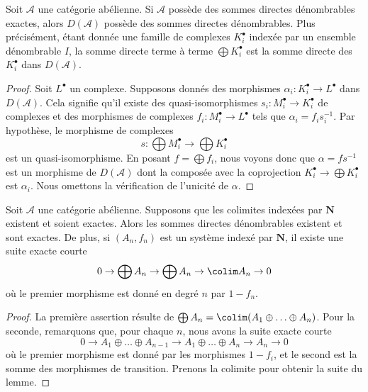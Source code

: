\begin{lemma}
\label{lemma-direct-sums}
Soit $\mathcal{A}$ une catégorie abélienne.
Si $\mathcal{A}$ possède des sommes directes dénombrables exactes, alors
$D(\mathcal{A})$ possède des sommes directes dénombrables. Plus précisément,
étant donnée une famille de complexes $K_i^\bullet$ indexée par un ensemble
dénombrable $I$, la somme directe terme à terme $\bigoplus K_i^\bullet$ est la
somme directe des $K_i^\bullet$ dans $D(\mathcal{A})$.
\end{lemma}

\begin{proof}
Soit $L^\bullet$ un complexe. Supposons donnés des morphismes
$\alpha_i : K_i^\bullet \to L^\bullet$ dans $D(\mathcal{A})$.
Cela signifie qu'il existe des quasi-isomorphismes
$s_i : M_i^\bullet \to K_i^\bullet$ de complexes et des morphismes de
complexes $f_i : M_i^\bullet \to L^\bullet$ tels que
$\alpha_i = f_is_i^{-1}$. Par hypothèse, le morphisme de complexes
$$
s : \bigoplus M_i^\bullet \longrightarrow \bigoplus K_i^\bullet
$$
est un quasi-isomorphisme. En posant $f = \bigoplus f_i$, nous voyons donc que
$\alpha = fs^{-1}$ est un morphisme de $D(\mathcal{A})$ dont la composée avec
la coprojection $K_i^\bullet \to \bigoplus K_i^\bullet$ est $\alpha_i$.
Nous omettons la vérification de l'unicité de $\alpha$.
\end{proof}

\begin{lemma}
\label{lemma-compute-colimit}
Soit $\mathcal{A}$ une catégorie abélienne. Supposons que les colimites
indexées par $\mathbf{N}$ existent et soient exactes. Alors les sommes directes
dénombrables existent et sont exactes. De plus, si $(A_n, f_n)$ est un système
indexé par $\mathbf{N}$, il existe une suite exacte courte
$$
0 \to \bigoplus A_n \to \bigoplus A_n \to \colim A_n \to 0
$$
où le premier morphisme est donné en degré $n$ par $1 - f_n$.
\end{lemma}

\begin{proof}
La première assertion résulte de
$\bigoplus A_n = \colim (A_1 \oplus \ldots \oplus A_n)$.
Pour la seconde, remarquons que, pour chaque $n$, nous avons la suite exacte
courte
$$
0 \to
A_1 \oplus \ldots \oplus A_{n - 1} \to
A_1 \oplus \ldots \oplus A_n \to A_n \to 0
$$
où le premier morphisme est donné par les morphismes $1 - f_i$, et le second
est la somme des morphismes de transition.
Prenons la colimite pour obtenir la suite du lemme.
\end{proof}

